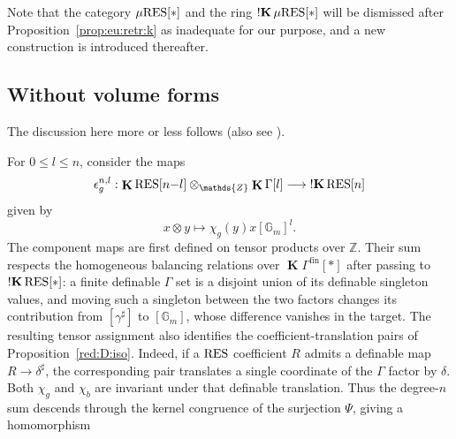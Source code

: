 \documentclass[12pt]{amsart}
\theoremstyle{plain}
\theoremstyle{definition}
\theoremstyle{remark}
\numberwithin{equation}{section}
\theoremstyle{plain}
\newcommand{\Z}{\mathds{Z}}
\newcommand{\G}{\mathds{G}}
\newcommand{\0}{\emptyset}
\newcommand{\fun}{\longrightarrow}
\newcommand{\efun}{\longmapsto}
\newcommand{\RES}{\textup{RES}}
\newcommand{\mgRES}{{\mu}{\RES}}
\DeclareMathOperator{\ggk}{\mathbf{K}}
\DeclareMathOperator{\sggk}{!\mathbf{K}}
\DeclareMathOperator{\fin}{fin}
\begin{document}
Note that the category $\mgRES[*]$ and the ring $\sggk \mgRES[*]$  will be dismissed after Proposition~\ref{prop:eu:retr:k} as inadequate for our purpose, and a new construction is introduced thereafter.

\subsection{Without volume forms}\label{subs:uni:retr:novol}


The discussion here more or less follows \cite[\S~2.5]{hru:loe:lef} (also see \cite[Theorem~10.5]{hrushovski:kazhdan:integration:vf}).

For $0 \leq l \leq n$, consider the maps
\[
\epsilon^{n,l}_g : \ggk \RES[n{-}l] \otimes_{\Z} \ggk \Gamma[l] \fun \sggk \RES[n]
\]
given by
\begin{equation}\label{kill:gamma}
x \otimes y \efun \chi_g(y) x [\G_m]^l.
\end{equation}
The component maps are first defined on tensor products over $\Z$. Their sum respects the homogeneous balancing relations over $\ggk\Gamma^{\fin}[*]$ after passing to $\sggk\RES[*]$: a finite definable $\Gamma$ set is a disjoint union of its definable singleton values, and moving such a singleton between the two factors changes its contribution from $[\gamma^\sharp]$ to $[\G_m]$, whose difference vanishes in the target. \label{review:section4:T001:start}
The resulting tensor assignment also identifies the coefficient-translation pairs of Proposition~\ref{red:D:iso}. Indeed, if a $\RES$ coefficient $R$ admits a definable map $R\fun\delta^\sharp$, the corresponding pair translates a single coordinate of the $\Gamma$ factor by $\delta$. Both $\chi_g$ and $\chi_b$ are invariant under that definable translation. Thus the degree-$n$ sum descends through the kernel congruence of the surjection $\Psi$, giving a homomorphism
\end{document}
